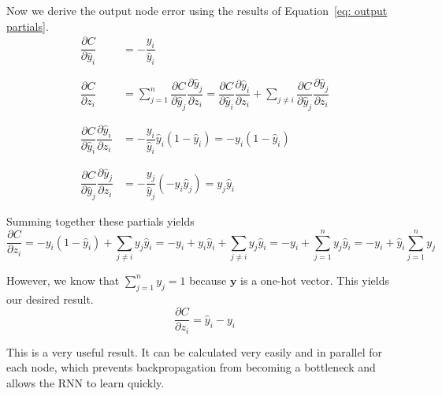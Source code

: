 \documentclass[pageno]{final_paper}
\begin{document}
Now we derive the output node error using the results of Equation~\eqref{eq: output partials}.
\begin{equation}
    \label{eq: loss function partial to h}
    \begin{aligned}
        \dfrac{\partial C}{\partial \hat{y}_i} &= -\dfrac{y_i}{\hat{y}_i} \\
        &\phantom{=} \\
        \dfrac{\partial C}{\partial z_i} &= \sum\limits_{j=1}^n \dfrac{\partial C}{\partial \hat{y}_j}\dfrac{\partial \hat{y}_j}{\partial z_i} =
            \dfrac{\partial C}{\partial \hat{y}_i}\dfrac{\partial \hat{y}_i}{\partial z_i} + \sum\limits_{j\neq i} \dfrac{\partial C}{\partial \hat{y}_j}\dfrac{\partial \hat{y}_j}{\partial z_i} \\
        &\phantom{=} \\
        \dfrac{\partial C}{\partial \hat{y}_i}\dfrac{\partial \hat{y}_i}{\partial z_i} &= -\dfrac{y_i}{\hat{y}_i} \hat{y}_i (1-\hat{y}_i) = -y_i(1-\hat{y}_i) \\
        &\phantom{=} \\
        \dfrac{\partial C}{\partial \hat{y}_j}\dfrac{\partial \hat{y}_j}{\partial z_i} &= -\dfrac{y_j}{\hat{y}_j} \left(-\hat{y}_i\hat{y}_j\right) = y_j\hat{y}_i
    \end{aligned}
\end{equation}

Summing together these partials yields
\begin{equation}
    \dfrac{\partial C}{\partial z_i} = -y_i(1-\hat{y}_i) + \sum\limits_{j\neq i} y_j\hat{y}_i =
        -y_i + y_i\hat{y}_i + \sum\limits_{j\neq i} y_j\hat{y}_i = -y_i + \sum\limits_{j = 1}^n y_j\hat{y}_i = -y_i + \hat{y}_i\sum\limits_{j=1}^n y_j
\end{equation}

However, we know that $\sum_{j=1}^n y_j = 1$ because $\mathbf{y}$ is a one-hot vector. This
yields our desired result.
\begin{equation}
    \dfrac{\partial C}{\partial z_i} = \hat{y}_i - y_i
\end{equation}

This is a very useful result. It can be calculated very easily and in parallel
for each node, which prevents backpropagation from becoming a bottleneck and
allows the RNN to learn quickly.

\end{document}
